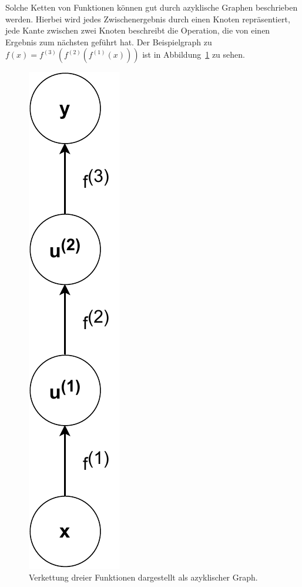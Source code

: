Solche Ketten von Funktionen k\"onnen gut durch
azyklische Graphen beschrieben werden. Hierbei wird jedes Zwischenergebnis
durch einen Knoten repr\"asentiert, jede Kante zwischen zwei Knoten beschreibt
die Operation, die von einen Ergebnis zum n\"achsten gef\"uhrt hat.
Der Beispielgraph zu $f(x) = f^{(3)}(f^{(2)}(f^{(1)}(x)))$ ist in
Abbildung~\ref{fig:einfacher-graph} zu sehen.

\begin{figure}[h]
    \centering
    \includegraphics[height=0.3\textheight]{abbildungen/basic_network_graph}
    \caption{Verkettung dreier Funktionen dargestellt als azyklischer Graph.}
    \label{fig:einfacher-graph}
\end{figure}

